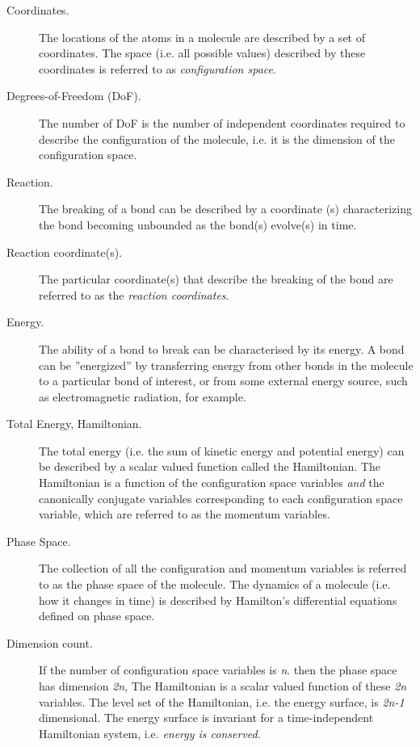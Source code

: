 \documentclass{article}
\begin{document}
\begin{description}

\item[Coordinates.] The locations of the atoms in a molecule are described by a set of coordinates. The space (i.e. all possible values) described by these coordinates is referred to as {\em configuration space}.

\item[Degrees-of-Freedom (DoF).] The number of  DoF is the number of independent coordinates required to describe the configuration of the molecule, i.e. it is the dimension of the configuration space.

\item[Reaction.] The breaking of a bond can be described by a coordinate (s) characterizing the bond becoming unbounded as the bond(s) evolve(s) in  time. 

\item[Reaction coordinate(s).]  The particular coordinate(s) that describe the breaking of the bond are referred to as the {\em reaction coordinates}.

\item[Energy.] The  ability of a bond to break can be characterised by its energy. A bond can be ''energized'' by transferring energy from other bonds in the molecule to a particular bond of interest, or from some external energy  source, such as electromagnetic radiation, for example. 

\item[Total Energy, Hamiltonian.] The total energy (i.e. the sum of kinetic energy and potential energy) can be described by a scalar valued function called the Hamiltonian. The Hamiltonian is a  function of the configuration space variables {\em and} the canonically conjugate variables corresponding to each configuration space variable, which are referred to as the momentum variables.



\item[Phase Space.] The collection of all the configuration  and momentum variables is referred to as the phase space of the molecule.  The dynamics of a molecule (i.e. how it changes in time) is described by Hamilton's differential equations defined on phase space. 

\item[Dimension count.] If the number of configuration space variables is {\em n}. then the phase space has dimension {\em 2n}, The Hamiltonian is a scalar valued function of these {\em 2n} variables. The level set of the Hamiltonian, i.e. the energy surface, is {\em 2n-1} dimensional. The energy surface is invariant for a time-independent Hamiltonian system, i.e. {\em energy is conserved}. 



\end{description}
\end{document}
